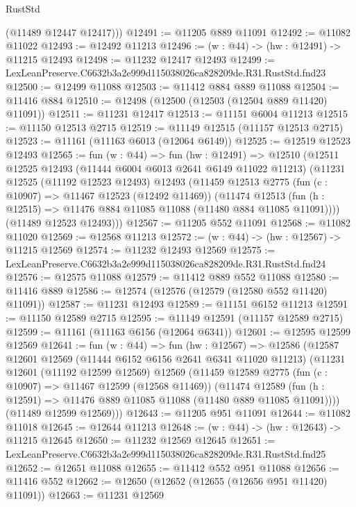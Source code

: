 \begin{lexlean}{RustStd}
\begin{coremodule}
        (@11489 @12447 @12417)))
@12491 := @11205 @889 @11091
@12492 := @11082 @11022
@12493 := @12492 @11213
@12496 := (w : @44) -> (hw : @12491) -> @11215 @12493
@12498 := @11232 @12417 @12493
@12499 := LexLeanPreserve.C6632b3a2e999d115038026ca828209de.R31.RustStd.fnd23
@12500 := @12499 @11088
@12503 := @11412 @884 @889 @11088
@12504 := @11416 @884
@12510 := @12498 (@12500 (@12503 (@12504 @889 @11420) @11091))
@12511 := @11231 @12417
@12513 := @11151 @6004 @11213
@12515 := @11150 @12513 @2715
@12519 := @11149 @12515 (@11157 @12513 @2715)
@12523 := @11161 (@11163 @6013 (@12064 @6149))
@12525 := @12519 @12523 @12493
@12565 := fun (w : @44) =>
  fun (hw : @12491) =>
  @12510
    (@12511
      @12525
      @12493
      (@11444 @6004 @6013 @2641 @6149 @11022 @11213)
      (@11231
        @12525
        (@11192 @12523 @12493)
        @12493
        (@11459
          @12513
          @2775
          (fun (c : @10907) => @11467 @12523 (@12492 @11469))
          (@11474
            @12513
            (fun (h : @12515) => @11476 @884 @11085 @11088 (@11480 @884 @11085 @11091))))
        (@11489 @12523 @12493)))
@12567 := @11205 @552 @11091
@12568 := @11082 @11020
@12569 := @12568 @11213
@12572 := (w : @44) -> (hw : @12567) -> @11215 @12569
@12574 := @11232 @12493 @12569
@12575 := LexLeanPreserve.C6632b3a2e999d115038026ca828209de.R31.RustStd.fnd24
@12576 := @12575 @11088
@12579 := @11412 @889 @552 @11088
@12580 := @11416 @889
@12586 := @12574 (@12576 (@12579 (@12580 @552 @11420) @11091))
@12587 := @11231 @12493
@12589 := @11151 @6152 @11213
@12591 := @11150 @12589 @2715
@12595 := @11149 @12591 (@11157 @12589 @2715)
@12599 := @11161 (@11163 @6156 (@12064 @6341))
@12601 := @12595 @12599 @12569
@12641 := fun (w : @44) =>
  fun (hw : @12567) =>
  @12586
    (@12587
      @12601
      @12569
      (@11444 @6152 @6156 @2641 @6341 @11020 @11213)
      (@11231
        @12601
        (@11192 @12599 @12569)
        @12569
        (@11459
          @12589
          @2775
          (fun (c : @10907) => @11467 @12599 (@12568 @11469))
          (@11474
            @12589
            (fun (h : @12591) => @11476 @889 @11085 @11088 (@11480 @889 @11085 @11091))))
        (@11489 @12599 @12569)))
@12643 := @11205 @951 @11091
@12644 := @11082 @11018
@12645 := @12644 @11213
@12648 := (w : @44) -> (hw : @12643) -> @11215 @12645
@12650 := @11232 @12569 @12645
@12651 := LexLeanPreserve.C6632b3a2e999d115038026ca828209de.R31.RustStd.fnd25
@12652 := @12651 @11088
@12655 := @11412 @552 @951 @11088
@12656 := @11416 @552
@12662 := @12650 (@12652 (@12655 (@12656 @951 @11420) @11091))
@12663 := @11231 @12569

\end{coremodule}
\end{lexlean}
